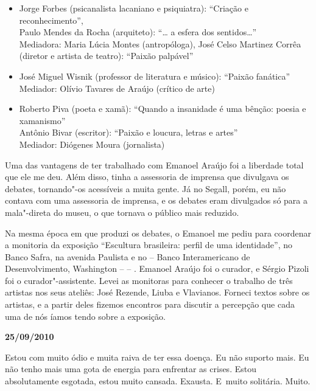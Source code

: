 \begin{itemize}
\item
  Jorge Forbes (psicanalista lacaniano e psiquiatra): ``Criação e
  reconhecimento'', \\Paulo Mendes da Rocha (arquiteto): ``… a
  esfera dos sentidos…''\\Mediadora: Maria Lúcia Montes
  (antropóloga), José Celso Martinez Corrêa (diretor e artista de
  teatro): ``Paixão palpável''
\item
  José Miguel Wisnik (professor de literatura e músico): ``Paixão
  fanática''\\Mediador: Olívio Tavares de Araújo (crítico de arte)
\item
  Roberto Piva (poeta e xamã): ``Quando a insanidade é uma bênção:
  poesia e xamanismo''\\Antônio Bivar (escritor): ``Paixão e loucura,
  letras e artes''\\Mediador: Diógenes Moura (jornalista)
\end{itemize}

Uma das vantagens de ter trabalhado com Emanoel Araújo foi a liberdade
total que ele me deu. Além disso, tinha a assessoria de imprensa que
divulgava os debates, tornando"-os acessíveis a muita gente. Já no
Segall, porém, eu não contava com uma assessoria de imprensa, e os
debates eram divulgados só para a mala"-direta do museu, o que tornava o
público mais reduzido.

Na mesma época em que produzi os debates, o Emanoel me pediu para
coordenar a monitoria da exposição ``Escultura brasileira: perfil de uma
identidade'', no Banco Safra, na avenida Paulista e no  -- Banco
Interamericano de Desenvolvimento, Washington --  -- . Emanoel
Araújo foi o curador, e Sérgio Pizoli foi o curador"-assistente. Levei as
monitoras para conhecer o trabalho de três artistas nos seus ateliês:
José Rezende, Liuba e Vlavianos. Forneci textos sobre os artistas, e a
partir deles fizemos encontros para discutir a percepção que cada uma de
nós íamos tendo sobre a exposição.

\begin{flushright}\textbf{25/09/2010}\end{flushright}


Estou com muito ódio e muita raiva de ter essa doença. Eu não suporto
mais. Eu não tenho mais uma gota de energia para enfrentar as crises.
Estou absolutamente esgotada, estou muito cansada. Exausta. E~muito
solitária. Muito.

